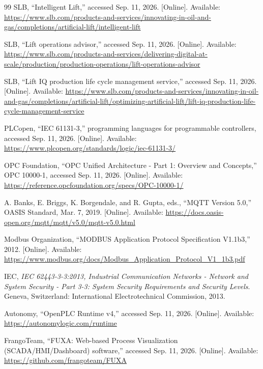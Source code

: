 \documentclass[conference]{IEEEtran}
\begin{document}
\begin{thebibliography}{99}
SLB, ``Intelligent Lift,'' accessed Sep. 11, 2026. [Online]. Available: \url{https://www.slb.com/products-and-services/innovating-in-oil-and-gas/completions/artificial-lift/intelligent-lift}

SLB, ``Lift operations advisor,'' accessed Sep. 11, 2026. [Online]. Available: \url{https://www.slb.com/products-and-services/delivering-digital-at-scale/production/production-operations/lift-operations-advisor}

SLB, ``Lift IQ production life cycle management service,'' accessed Sep. 11, 2026. [Online]. Available: \url{https://www.slb.com/products-and-services/innovating-in-oil-and-gas/completions/artificial-lift/optimizing-artificial-lift/lift-iq-production-life-cycle-management-service}

PLCopen, ``IEC 61131-3,'' programming languages for programmable controllers, accessed Sep. 11, 2026. [Online]. Available: \url{https://www.plcopen.org/standards/logic/iec-61131-3/}

OPC Foundation, ``OPC Unified Architecture - Part 1: Overview and Concepts,'' OPC 10000-1, accessed Sep. 11, 2026. [Online]. Available: \url{https://reference.opcfoundation.org/specs/OPC-10000-1/}

A. Banks, E. Briggs, K. Borgendale, and R. Gupta, eds., ``MQTT Version 5.0,'' OASIS Standard, Mar. 7, 2019. [Online]. Available: \url{https://docs.oasis-open.org/mqtt/mqtt/v5.0/mqtt-v5.0.html}

Modbus Organization, ``MODBUS Application Protocol Specification V1.1b3,'' 2012. [Online]. Available: \url{https://www.modbus.org/docs/Modbus_Application_Protocol_V1_1b3.pdf}

IEC, \emph{IEC 62443-3-3:2013, Industrial Communication Networks - Network and System Security - Part 3-3: System Security Requirements and Security Levels}. Geneva, Switzerland: International Electrotechnical Commission, 2013.

Autonomy, ``OpenPLC Runtime v4,'' accessed Sep. 11, 2026. [Online]. Available: \url{https://autonomylogic.com/runtime}

FrangoTeam, ``FUXA: Web-based Process Visualization (SCADA/HMI/Dashboard) software,'' accessed Sep. 11, 2026. [Online]. Available: \url{https://github.com/frangoteam/FUXA}

\end{thebibliography}
\end{document}
